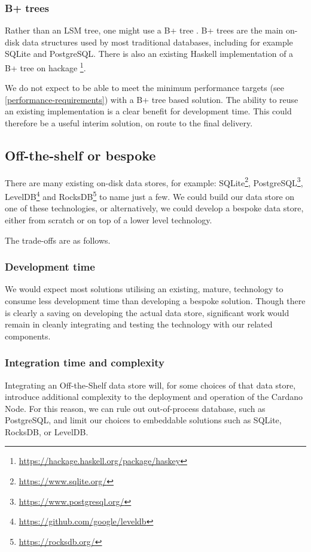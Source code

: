 \documentclass[11pt,a4paper]{article}
\begin{document}
\subsubsection{B+ trees}
Rather than an LSM tree, one might use a B+ tree \citep{journals/csur/Comer79}.
B+ trees are the main on-disk data structures used by most traditional
databases, including for example SQLite and PostgreSQL. There is also an
existing Haskell implementation of a B+ tree on hackage%
\footnote{\url{https://hackage.haskell.org/package/haskey}}.

We do not expect to be able to meet the minimum performance targets (see
\cref{performance-requirements}) with a B+ tree based solution. The ability to
reuse an existing implementation is a clear benefit for development time. This
could therefore be a useful interim solution, on route to the final delivery.

\subsection{Off-the-shelf or bespoke}

There are many existing on-disk data stores, for example:
SQLite\footnote{\url{https://www.sqlite.org/}},
PostgreSQL\footnote{\url{https://www.postgresql.org/}},
LevelDB\footnote{\url{https://github.com/google/leveldb}}
and RocksDB\footnote{\url{https://rocksdb.org/}} to name just a few.
We could build our data store on one of these technologies, or alternatively,
we could develop a bespoke data store, either from scratch or on top of a lower
level technology.

The trade-offs are as follows.

\subsubsection{Development time}

We would expect most solutions utilising an existing, mature, technology to
consume less development time than developing a bespoke solution. Though there
is clearly a saving on developing the actual data store, significant work would
remain in cleanly integrating and testing the technology with our related
components.

\subsubsection{Integration time and complexity}

Integrating an Off-the-Shelf data store will, for some choices of that data
store, introduce additional complexity to the deployment and operation of the
Cardano Node. For this reason, we can rule out out-of-process database, such as
PostgreSQL, and limit our choices to embeddable solutions such as SQLite,
RocksDB, or LevelDB.
\end{document}
